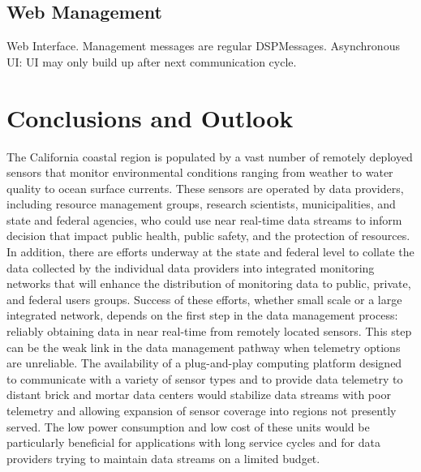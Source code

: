 \documentclass[conference]{IEEEtran}
\begin{document}
\subsection{Web Management}

Web Interface. Management messages are regular
DSPMessages. Asynchronous UI: UI may only build up after next
communication cycle.

\section{Conclusions and Outlook}
\label{SEC_CONCLUSION}

The California coastal region is populated by a vast number of
remotely deployed sensors that monitor environmental conditions
ranging from weather to water quality to ocean surface currents.
These sensors are operated by data providers, including resource
management groups, research scientists, municipalities, and state and
federal agencies, who could use near real-time data streams to inform
decision that impact public health, public safety, and the protection
of resources.  In addition, there are efforts underway at the state
and federal level to collate the data collected by the individual data
providers into integrated monitoring networks that will enhance the
distribution of monitoring data to public, private, and federal users
groups.  Success of these efforts, whether small scale or a large
integrated network, depends on the first step in the data management
process: reliably obtaining data in near real-time from remotely
located sensors.  This step can be the weak link in the data
management pathway when telemetry options are unreliable.  The
availability of a plug-and-play computing platform designed to
communicate with a variety of sensor types and to provide data
telemetry to distant brick and mortar data centers would stabilize
data streams with poor telemetry and allowing expansion of sensor
coverage into regions not presently served.  The low power consumption
and low cost of these units would be particularly beneficial for
applications with long service cycles and for data providers trying to
maintain data streams on a limited budget.



\end{document}
